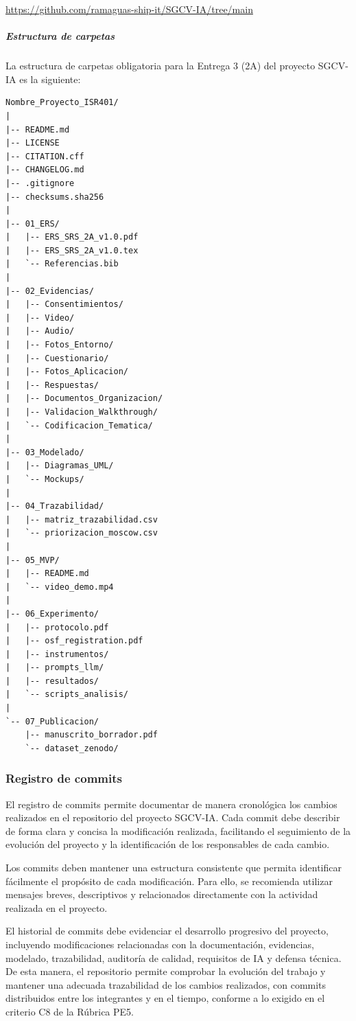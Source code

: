 \documentclass[
]{article}
\begin{document}
\url{https://github.com/ramaguas-ship-it/SGCV-IA/tree/main}

\subparagraph{Estructura de carpetas}\label{estructura-de-carpetas}

La estructura de carpetas obligatoria para la Entrega 3 (2A) del proyecto SGCV-IA es la siguiente:

\begin{verbatim}
Nombre_Proyecto_ISR401/
|
|-- README.md
|-- LICENSE
|-- CITATION.cff
|-- CHANGELOG.md
|-- .gitignore
|-- checksums.sha256
|
|-- 01_ERS/
|   |-- ERS_SRS_2A_v1.0.pdf
|   |-- ERS_SRS_2A_v1.0.tex
|   `-- Referencias.bib
|
|-- 02_Evidencias/
|   |-- Consentimientos/
|   |-- Video/
|   |-- Audio/
|   |-- Fotos_Entorno/
|   |-- Cuestionario/
|   |-- Fotos_Aplicacion/
|   |-- Respuestas/
|   |-- Documentos_Organizacion/
|   |-- Validacion_Walkthrough/
|   `-- Codificacion_Tematica/
|
|-- 03_Modelado/
|   |-- Diagramas_UML/
|   `-- Mockups/
|
|-- 04_Trazabilidad/
|   |-- matriz_trazabilidad.csv
|   `-- priorizacion_moscow.csv
|
|-- 05_MVP/
|   |-- README.md
|   `-- video_demo.mp4
|
|-- 06_Experimento/
|   |-- protocolo.pdf
|   |-- osf_registration.pdf
|   |-- instrumentos/
|   |-- prompts_llm/
|   |-- resultados/
|   `-- scripts_analisis/
|
`-- 07_Publicacion/
    |-- manuscrito_borrador.pdf
    `-- dataset_zenodo/
\end{verbatim}

\subsubsection{Registro de commits}\label{registro-de-commits}

El registro de commits permite documentar de manera cronológica los cambios realizados en el repositorio del proyecto SGCV-IA. Cada commit debe describir de forma clara y concisa la modificación realizada, facilitando el seguimiento de la evolución del proyecto y la identificación de los responsables de cada cambio.

Los commits deben mantener una estructura consistente que permita identificar fácilmente el propósito de cada modificación. Para ello, se recomienda utilizar mensajes breves, descriptivos y relacionados directamente con la actividad realizada en el proyecto.

El historial de commits debe evidenciar el desarrollo progresivo del proyecto, incluyendo modificaciones relacionadas con la documentación, evidencias, modelado, trazabilidad, auditoría de calidad, requisitos de IA y defensa técnica. De esta manera, el repositorio permite comprobar la evolución del trabajo y mantener una adecuada trazabilidad de los cambios realizados, con commits distribuidos entre los integrantes y en el tiempo, conforme a lo exigido en el criterio C8 de la Rúbrica PE5.
\end{document}
